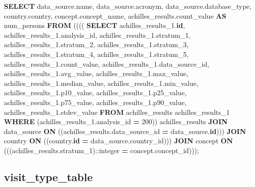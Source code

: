 \documentclass[
]{book}
\newenvironment{Shaded}{\begin{snugshade}}{\end{snugshade}}
\newcommand{\CharTok}[1]{\textcolor[rgb]{0.31,0.60,0.02}{#1}}
\newcommand{\DecValTok}[1]{\textcolor[rgb]{0.00,0.00,0.81}{#1}}
\newcommand{\KeywordTok}[1]{\textcolor[rgb]{0.13,0.29,0.53}{\textbf{#1}}}
\newcommand{\NormalTok}[1]{#1}
\newcommand{\OperatorTok}[1]{\textcolor[rgb]{0.81,0.36,0.00}{\textbf{#1}}}
\begin{document}
\begin{Shaded}
\begin{Highlighting}[]
\KeywordTok{SELECT}\NormalTok{ data\_source.name,}
\NormalTok{   data\_source.acronym,}
\NormalTok{   data\_source.database\_type,}
\NormalTok{   country.country,}
\NormalTok{   concept.concept\_name,}
\NormalTok{   achilles\_results.count\_value }\KeywordTok{AS}\NormalTok{ num\_persons}
  \KeywordTok{FROM}\NormalTok{ (((( }\KeywordTok{SELECT}\NormalTok{ achilles\_results\_1.}\KeywordTok{id}\NormalTok{,}
\NormalTok{           achilles\_results\_1.analysis\_id,}
\NormalTok{           achilles\_results\_1.stratum\_1,}
\NormalTok{           achilles\_results\_1.stratum\_2,}
\NormalTok{           achilles\_results\_1.stratum\_3,}
\NormalTok{           achilles\_results\_1.stratum\_4,}
\NormalTok{           achilles\_results\_1.stratum\_5,}
\NormalTok{           achilles\_results\_1.count\_value,}
\NormalTok{           achilles\_results\_1.data\_source\_id,}
\NormalTok{           achilles\_results\_1.avg\_value,}
\NormalTok{           achilles\_results\_1.max\_value,}
\NormalTok{           achilles\_results\_1.median\_value,}
\NormalTok{           achilles\_results\_1.min\_value,}
\NormalTok{           achilles\_results\_1.p10\_value,}
\NormalTok{           achilles\_results\_1.p25\_value,}
\NormalTok{           achilles\_results\_1.p75\_value,}
\NormalTok{           achilles\_results\_1.p90\_value,}
\NormalTok{           achilles\_results\_1.stdev\_value}
          \KeywordTok{FROM}\NormalTok{ achilles\_results achilles\_results\_1}
         \KeywordTok{WHERE}\NormalTok{ (achilles\_results\_1.analysis\_id }\OperatorTok{=} \DecValTok{200}\NormalTok{)) achilles\_results}
    \KeywordTok{JOIN}\NormalTok{ data\_source }\KeywordTok{ON}\NormalTok{ ((achilles\_results.data\_source\_id }\OperatorTok{=}\NormalTok{ data\_source.}\KeywordTok{id}\NormalTok{)))}
    \KeywordTok{JOIN}\NormalTok{ country }\KeywordTok{ON}\NormalTok{ ((country.}\KeywordTok{id} \OperatorTok{=}\NormalTok{ data\_source.country\_id)))}
    \KeywordTok{JOIN}\NormalTok{ concept }\KeywordTok{ON}\NormalTok{ (((achilles\_results.stratum\_1):}\CharTok{:integer} \OperatorTok{=}\NormalTok{ concept.concept\_id)));}
\end{Highlighting}
\end{Shaded}

\hypertarget{visit_type_table}{%
\subsection*{visit\_type\_table}\label{visit_type_table}}
\end{document}
